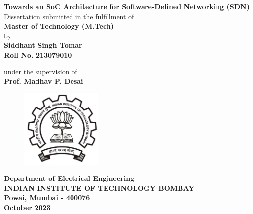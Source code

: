 \documentclass[12pt]{report}
\author{Siddhant}
\begin{document}
\renewcommand{\arraystretch}{1.5}
\begin{center}
\Large
\textbf{Towards an SoC Architecture for Software-Defined Networking (SDN)}\\
\bigskip
\bigskip
\bigskip
\large
\normalsize
\vspace*{0.5cm}
Dissertation submitted in the fulfillment of  \\
\vspace*{.8cm} \textbf{Master of Technology (M.Tech)}\\
by\\
\vspace*{0.5cm}
\textbf{\large Siddhant Singh Tomar} \\
\textbf{Roll No. 213079010}\\


\vspace*{0.5cm}

under the supervision of\\
\textbf{Prof. Madhav P. Desai}\\
\vspace*{1cm}


\vspace*{0.5cm}
\begin{figure}[h!]
 \centering
 \includegraphics[width=4cm]{../figures/iitb_logo.jpg}
\end{figure}
\bigskip
\textbf{Department of Electrical Engineering}\\
\bigskip
\textbf{INDIAN INSTITUTE OF TECHNOLOGY BOMBAY}\\
\textbf{Powai, Mumbai - 400076}\\
\textbf{October 2023}\\
\end{center}
\thispagestyle{empty}

\end{document}
